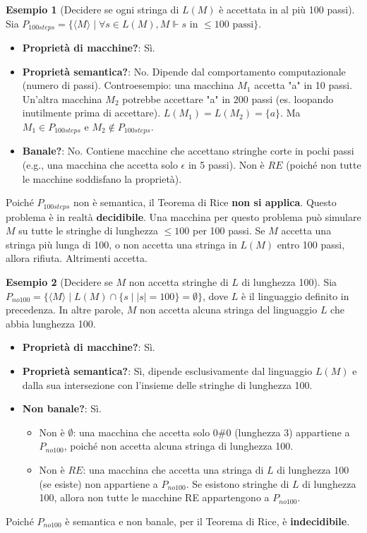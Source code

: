 \documentclass[a4paper]{article}
\theoremstyle{definition} %
\newtheorem{example}{Esempio}
\begin{document}
\begin{example}[Decidere se ogni stringa di $L(M)$ è accettata in al più 100 passi]
Sia $P_{100steps} = \{\langle M \rangle \mid \forall s \in L(M), M \Vdash s \text{ in } \le 100 \text{ passi}\}$.
\begin{itemize}
    \item \textbf{Proprietà di macchine?}: Sì.
    \item \textbf{Proprietà semantica?}: No. Dipende dal comportamento computazionale (numero di passi). Controesempio: una macchina $M_1$ accetta "a" in 10 passi. Un'altra macchina $M_2$ potrebbe accettare "a" in 200 passi (es. loopando inutilmente prima di accettare). $L(M_1) = L(M_2) = \{a\}$. Ma $M_1 \in P_{100steps}$ e $M_2 \notin P_{100steps}$.
    \item \textbf{Banale?}: No. Contiene macchine che accettano stringhe corte in pochi passi (e.g., una macchina che accetta solo $\epsilon$ in 5 passi). Non è $RE$ (poiché non tutte le macchine soddisfano la proprietà).
\end{itemize}
Poiché $P_{100steps}$ non è semantica, il Teorema di Rice \textbf{non si applica}. Questo problema è in realtà \textbf{decidibile}. Una macchina per questo problema può simulare $M$ su tutte le stringhe di lunghezza $\le 100$ per 100 passi. Se $M$ accetta una stringa più lunga di 100, o non accetta una stringa in $L(M)$ entro 100 passi, allora rifiuta. Altrimenti accetta.
\end{example}

\begin{example}[Decidere se $M$ non accetta stringhe di $L$ di lunghezza 100]
Sia $P_{no100} = \{\langle M \rangle \mid L(M) \cap \{s \mid |s|=100\} = \emptyset\}$, dove $L$ è il linguaggio definito in precedenza. In altre parole, $M$ non accetta alcuna stringa del linguaggio $L$ che abbia lunghezza 100.
\begin{itemize}
    \item \textbf{Proprietà di macchine?}: Sì.
    \item \textbf{Proprietà semantica?}: Sì, dipende esclusivamente dal linguaggio $L(M)$ e dalla sua intersezione con l'insieme delle stringhe di lunghezza 100.
    \item \textbf{Non banale?}: Sì.
    \begin{itemize}
        \item Non è $\emptyset$: una macchina che accetta solo $0\#0$ (lunghezza 3) appartiene a $P_{no100}$, poiché non accetta alcuna stringa di lunghezza 100.
        \item Non è $RE$: una macchina che accetta una stringa di $L$ di lunghezza 100 (se esiste) non appartiene a $P_{no100}$. Se esistono stringhe di $L$ di lunghezza 100, allora non tutte le macchine RE appartengono a $P_{no100}$.
    \end{itemize}
\end{itemize}
Poiché $P_{no100}$ è semantica e non banale, per il Teorema di Rice, è \textbf{indecidibile}.
\end{example}
\end{document}
